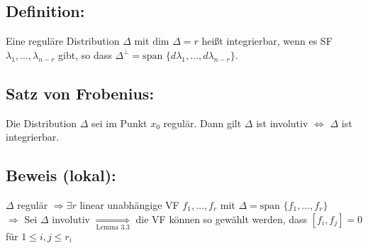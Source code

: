 \documentclass[ngerman]{tudscrreprt}
\begin{document}
\subsection*{Definition:} Eine reguläre Distribution $\Delta$ mit $\text{dim }\Delta = r$ heißt integrierbar, wenn es SF $\lambda_1, \dots, \lambda_{n-r}$ gibt, so dass $\Delta^{\perp} = \text{span }\{d \lambda_1,\dots, d\lambda_{n-r}\}$. 
\subsection*{Satz von Frobenius:} Die Distribution $\Delta$ sei im Punkt $x_0$ regulär. Dann gilt $\Delta$ ist involutiv $\iff$ $\Delta$ ist integrierbar.
\subsection*{Beweis (lokal):} $\Delta$ regulär $\Rightarrow \exists r$ linear unabhängige VF $f_1, \dots, f_r$ mit $\Delta = \text{span }\{ f_1, \dots, f_r\}$\\ 
$\Rightarrow$ Sei $\Delta $ involutiv $\underset{\text{Lemma 3.3}}{\Rightarrow}$ die VF können so gewählt werden, dass $[f_i, f_j] = 0$ für $1\le i, j\le r_i$ 
\end{document}
